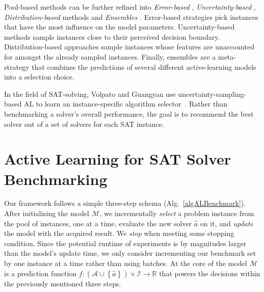 \documentclass[runningheads]{llncs}
\begin{document}
Pool-based methods can be further refined into \emph{Error-based} \cite{GolbandiKL11,KorenBV09}, \emph{Un\-cer\-tain\-ty-based} \cite{HarpaleY08,KapoorGUD07,TongK01}, \emph{Distribution-based} methods \cite{distribAL,SinhaED19} and \emph{Ensembles} \cite{KornerW06,MelvilleM04}.
Error-based strategies pick instances that have the most influence on the model parameters.
Uncertainty-based methods sample instances close to their perceived decision boundary.
Distribution-based approaches sample instances whose features are unaccounted for amongst the already sampled instances.
Finally, ensembles are a meta-strategy that combines the predictions of several different active-learning models into a selection choice.

In the field of SAT-solving, Volpato and Guangyan use uncertainty-sampling-based AL to learn an instance-specific algorithm selector~\cite{volpato2019active}.
Rather than benchmarking a solver's overall performance, the goal is to recommend the best solver out of a set of solvers for each SAT instance.


\section{Active Learning for SAT Solver Benchmarking}
\label{sec:main}
Our framework follows a simple three-step schema (Alg.~\ref{algALBenchmark}).
After initializing the model $\mathcal{M}$, we incrementally \emph{select} a problem instance from the pool of instances, one at a time, evaluate the new solver $\hat{a}$ on it, and \emph{update} the model with the acquired result.
We \emph{stop} when meeting some stopping condition.
Since the potential runtime of experiments is by magnitudes larger than the model's update time, we only consider incrementing our benchmark set by one instance at a time rather than using batches.
At the core of the model $\mathcal{M}$ is a prediction function $f\!: \left(\mathcal{A} \cup \left\lbrace \hat{a} \right\rbrace\right) \times \mathcal{I} \rightarrow \mathbb{R}$ that powers the decisions within the previously mentioned three steps.
\end{document}
